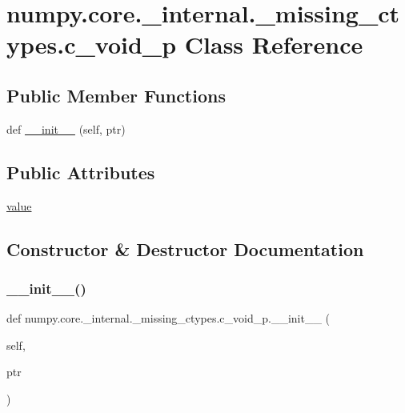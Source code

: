 \hypertarget{classnumpy_1_1core_1_1__internal_1_1__missing__ctypes_1_1c__void__p}{}\section{numpy.\+core.\+\_\+internal.\+\_\+missing\+\_\+ctypes.\+c\+\_\+void\+\_\+p Class Reference}
\label{classnumpy_1_1core_1_1__internal_1_1__missing__ctypes_1_1c__void__p}
\subsection*{Public Member Functions}
\begin{DoxyCompactItemize}
\item 
def \hyperlink{classnumpy_1_1core_1_1__internal_1_1__missing__ctypes_1_1c__void__p_afe6949fc6f000a976fd59e44427ee9ac}{\+\_\+\+\_\+init\+\_\+\+\_\+} (self, ptr)
\end{DoxyCompactItemize}
\subsection*{Public Attributes}
\begin{DoxyCompactItemize}
\item 
\hyperlink{classnumpy_1_1core_1_1__internal_1_1__missing__ctypes_1_1c__void__p_a594500881edf091b399eb38602fca520}{value}
\end{DoxyCompactItemize}


\subsection{Constructor \& Destructor Documentation}
\mbox{\label{classnumpy_1_1core_1_1__internal_1_1__missing__ctypes_1_1c__void__p_afe6949fc6f000a976fd59e44427ee9ac}} 
\subsubsection{\texorpdfstring{\+\_\+\+\_\+init\+\_\+\+\_\+()}{\_\_init\_\_()}}
{\footnotesize\ttfamily def numpy.\+core.\+\_\+internal.\+\_\+missing\+\_\+ctypes.\+c\+\_\+void\+\_\+p.\+\_\+\+\_\+init\+\_\+\+\_\+ (\begin{DoxyParamCaption}\item[{}]{self,  }\item[{}]{ptr }\end{DoxyParamCaption})}



